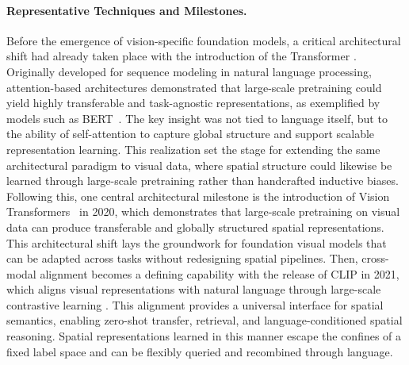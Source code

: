 \paragraph{Representative Techniques and Milestones.}
Before the emergence of vision-specific foundation models, a critical architectural shift had already taken place with the introduction of the Transformer \cite{attention}.
Originally developed for sequence modeling in natural language processing, attention-based architectures demonstrated that large-scale pretraining could yield highly transferable and task-agnostic representations, as exemplified by models such as BERT~\cite{devlin2019bert}.
The key insight was not tied to language itself, but to the ability of self-attention to capture global structure and support scalable representation learning.
This realization set the stage for extending the same architectural paradigm to visual data, where spatial structure could likewise be learned through large-scale pretraining rather than handcrafted inductive biases.
Following this, one central architectural milestone is the introduction of Vision Transformers~\cite{vit} in 2020, which demonstrates that large-scale pretraining on visual data can produce transferable and globally structured spatial representations.
This architectural shift lays the groundwork for foundation visual models that can be adapted across tasks without redesigning spatial pipelines.
Then, cross-modal alignment becomes a defining capability with the release of CLIP in 2021, which aligns visual representations with natural language through large-scale contrastive learning \cite{radford2021learning}.
This alignment provides a universal interface for spatial semantics, enabling zero-shot transfer, retrieval, and language-conditioned spatial reasoning.
Spatial representations learned in this manner escape the confines of a fixed label space and can be flexibly queried and recombined through language.




